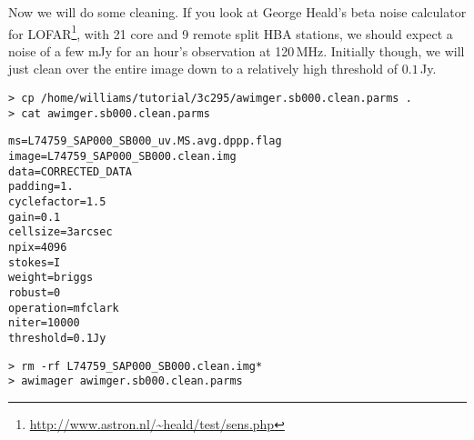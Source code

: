 Now we will do some cleaning. If you look at George Heald's beta noise calculator for LOFAR\footnote{\url{http://www.astron.nl/~heald/test/sens.php}}, with 21 core and 9 remote split HBA stations, we should expect a noise of a few mJy for an hour's observation at 120\,MHz.  Initially though, we will just clean over the entire image down to a relatively high threshold of $0.1$\,Jy.
\begin{verbatim}
> cp /home/williams/tutorial/3c295/awimger.sb000.clean.parms .
> cat awimger.sb000.clean.parms
\end{verbatim}
\begin{lstlisting}
ms=L74759_SAP000_SB000_uv.MS.avg.dppp.flag
image=L74759_SAP000_SB000.clean.img
data=CORRECTED_DATA
padding=1.
cyclefactor=1.5
gain=0.1
cellsize=3arcsec
npix=4096
stokes=I
weight=briggs
robust=0
operation=mfclark
niter=10000
threshold=0.1Jy
\end{lstlisting}
\begin{verbatim}
> rm -rf L74759_SAP000_SB000.clean.img*
> awimager awimger.sb000.clean.parms
\end{verbatim}


